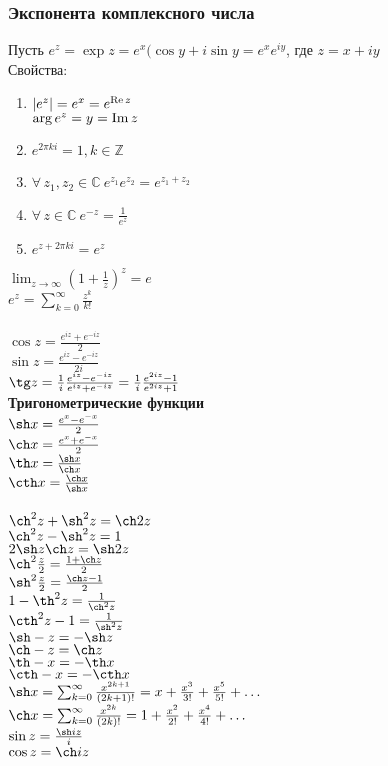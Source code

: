 \documentclass[12pt]{article}
\begin{document}
\subsubsection{Экспонента комплексного числа}
Пусть $e^z = \exp z = e^x(\cos y + i\sin y = e^x e^{iy}$, где $z = x+iy$\\
Свойства:
\begin{enumerate}
    \item $|e^z|=e^x=e^{\operatorname{Re} z}$\\
    $\arg e^z = y = \operatorname{Im} z$
    \item $e^{2\pi ki} = 1, k \in \mathbb{Z}$
    \item $\forall\,z_1,z_2 \in \mathbb{C}\ e^{z_1}e^{z_2} = e^{z_1+z_2}$
    \item $\forall\,z\in\mathbb{C}\ e^{-z} = \frac{1}{e^z}$
    \item $e^{z+2\pi k i} = e^z$
\end{enumerate}
$\lim_{z\rightarrow \infty} (1+\frac1z)^z = e$\\
$e^z = \sum_{k=0}^\infty \frac{z^k}{k!}$\\\\
$\cos z = \frac{e^{iz}+e^{-iz}}2$\\
$\sin z = \frac{e^{iz}-e^{-iz}}{2i}$\\
$\tg z = \frac1i\frac{e^{iz}-e^{-iz}}{e^{iz}+e^{-iz}} = \frac1i\frac{e^{2iz}-1}{e^{2iz}+1}$\\
\textbf{Тригонометрические функции}\\
$\sh x = \frac{e^x-e^{-x}}{2}$\\
$\ch x = \frac{e^x+e^{-x}}{2}$\\
$\th x = \frac{\sh x}{\ch x}$\\
$\cth x = \frac{\ch x}{\sh x}$\\\\
$\ch^2 z + \sh^2 z = \ch 2z$\\
$\ch^2 z - \sh^2 z = 1$\\
$2\sh z \ch z = \sh 2z$\\
$\ch^2 \frac z2 = \frac{1+\ch z}{2}$\\
$\sh^2 \frac z2 = \frac{\ch z-1}{2}$\\
$1-\th^2 z = \frac{1}{\ch^2 z}$\\
$\cth^2 z - 1 = \frac{1}{\sh^2 z}$\\
$\sh -z = - \sh z$\\
$\ch -z = \ch z$\\
$\th -x = -\th x$\\
$\cth -x = -\cth x$\\
$\sh x = \sum_{k=0}^\infty \frac{x^{2k+1}}{(2k+1)!} = x + \frac{x^3}{3!} + \frac{x^5}{5!} + \ldots$\\
$\ch x = \sum_{k=0}^\infty \frac{x^{2k}}{(2k)!} = 1 + \frac{x^2}{2!} + \frac{x^4}{4!} + \ldots$\\
$\sin z = \frac{\sh iz}{i}$\\
$\cos z = \ch iz$
\end{document}

